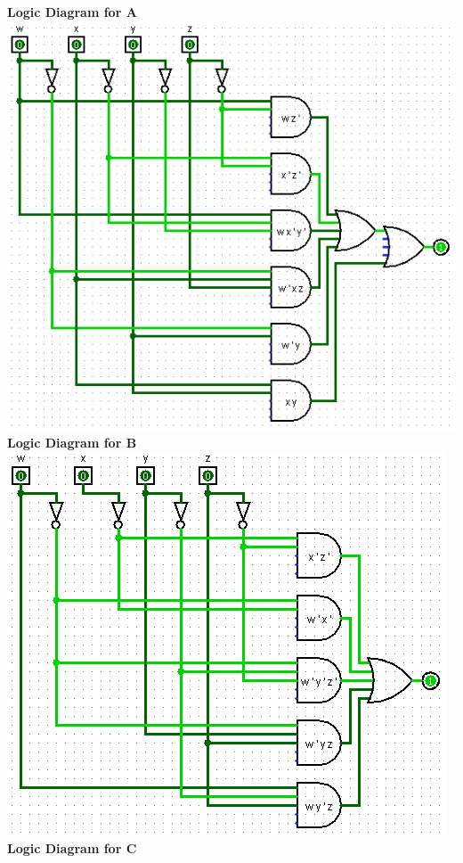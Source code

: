 \documentclass{article}
\begin{document}
\begin{enumerate}[label=\arabic*]
    \textbf{Logic Diagram for A} \\
    \includegraphics[scale=.72]{A.PNG} \\
    \newpage
    \textbf{Logic Diagram for B} \\
    \includegraphics[scale=.72]{B.PNG} \\
    \hfill
    \textbf{Logic Diagram for C} \\

\end{enumerate}
\end{document}
